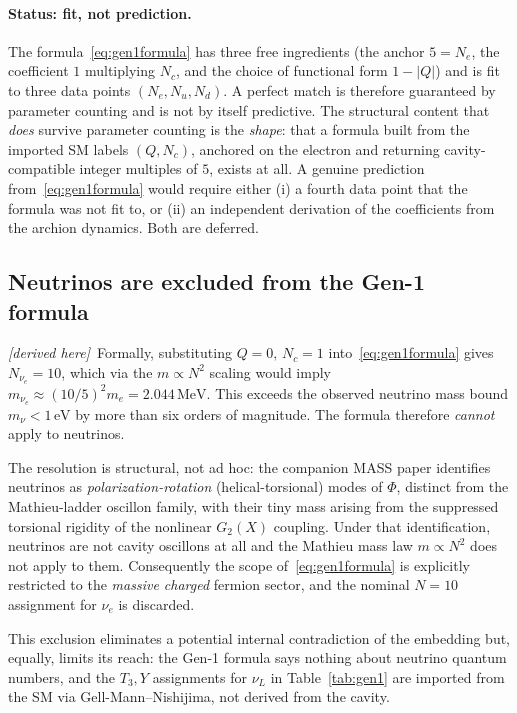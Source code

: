 \documentclass[11pt]{article}
\newcommand{\derived}{\textit{[derived here]}}
\begin{document}
\paragraph{Status: fit, not prediction.}
The formula~\eqref{eq:gen1formula} has three free ingredients
(the anchor $5=N_e$, the coefficient $1$ multiplying $N_c$, and
the choice of functional form $1-|Q|$) and is fit to three data
points $(N_e,N_u,N_d)$. A perfect match is therefore guaranteed
by parameter counting and is not by itself predictive. The
structural content that \emph{does} survive parameter counting
is the \emph{shape}: that a formula built from the imported SM
labels $(Q,N_c)$, anchored on the electron and returning
cavity-compatible integer multiples of $5$, exists at all. A
genuine prediction from~\eqref{eq:gen1formula} would require
either (i) a fourth data point that the formula was not fit to,
or (ii) an independent derivation of the coefficients from the
archion dynamics. Both are deferred.

\subsection{Neutrinos are excluded from the Gen-1 formula}
\label{sec:neutrinos_exclusion}

\derived\ Formally, substituting $Q=0,\,N_c=1$
into~\eqref{eq:gen1formula} gives $N_{\nu_e}=10$, which
via the $m\propto N^2$ scaling would imply
$m_{\nu_e}\approx (10/5)^2 m_e=2.044\,\text{MeV}$.
This exceeds the observed neutrino mass bound
$m_\nu<1\,\text{eV}$ by more than six orders of magnitude.
The formula therefore \emph{cannot} apply to neutrinos.

The resolution is structural, not ad hoc: the companion MASS
paper \cite{Lotishvili2026} identifies neutrinos as
\emph{polarization-rotation} (helical-torsional) modes of
$\Phi$, distinct from the Mathieu-ladder oscillon family, with
their tiny mass arising from the suppressed torsional rigidity
of the nonlinear $G_2(X)$ coupling. Under that identification,
neutrinos are not cavity oscillons at all and the Mathieu
mass law $m\propto N^2$ does not apply to them. Consequently
the scope of~\eqref{eq:gen1formula} is explicitly restricted
to the \emph{massive charged} fermion sector, and the nominal
$N=10$ assignment for $\nu_e$ is discarded.

This exclusion eliminates a potential internal contradiction
of the embedding but, equally, limits its reach: the Gen-1
formula says nothing about neutrino quantum numbers, and the
$T_3,Y$ assignments for $\nu_L$ in Table~\ref{tab:gen1} are
imported from the SM via Gell-Mann--Nishijima, not derived
from the cavity.
\end{document}
